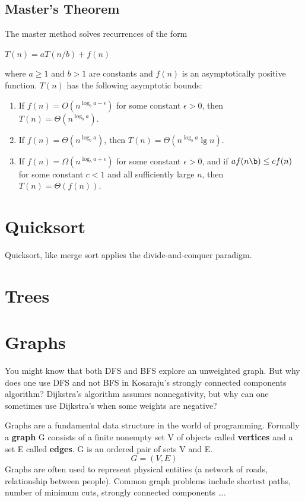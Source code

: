 \documentclass[]{book}
\begin{document}
      \section{Master's Theorem}
        The master method solves recurrences of the form
        \begin{flushleft}
          $T(n) = aT(n/b) + f(n)$
        \end{flushleft}
        where $a \geq 1$ and $b > 1$ are constants and $f(n)$ is an asymptotically positive
        function. $T(n)$ has the following asymptotic bounds:
        \begin{enumerate}
          \item If $f(n) = O(n^{\log_b a-\epsilon})$ for some constant $\epsilon > 0$,
          then\medskip\\ $T(n) = \Theta(n^{\log_b a})$.
          \item If $f(n) = \Theta(n^{\log_b a})$, then $T(n) = \Theta(n^{\log_b a}\lg n)$.
          \item If $f(n) = \Omega(n^{\log_b a+\epsilon})$ for some constant $\epsilon > 0$, and if
          $af(n\b) \leq cf(n)$ for some constant $c < 1$ and all sufficiently large $n$, then
          $T(n) = \Theta(f(n))$.
        \end{enumerate}
  \chapter{Quicksort}
    Quicksort, like merge sort applies the divide-and-conquer paradigm.
  \chapter{Trees}

  \chapter{Graphs}
  You might know that both DFS and BFS explore an unweighted graph. But why does one use DFS
  and not BFS in Kosaraju's strongly connected components algorithm? Dijkstra's algorithm assumes
  nonnegativity, but why can one sometimes use Dijkstra's when some weights are negative?

  Graphs are a fundamental data structure in the world of programming. Formally
  a \textbf{graph} G consists of a finite nonempty set V of objects called \textbf{vertices}
  and a set E called \textbf{edges}. G is an ordered pair of sets V and E. $$ G = (V,E)$$
  \indent Graphs are often used to represent physical entities (a network of roads, relationship
  between people). Common graph problems include shortest paths, number of minimum cuts,
  strongly connected components \ldots.
\end{document}
